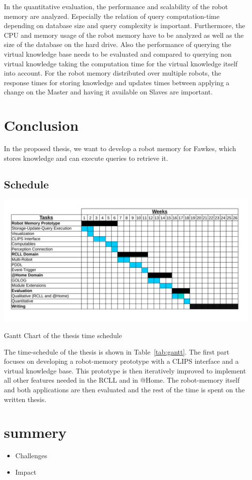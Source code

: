 \documentclass[a4paper,11pt]{article}
\newcommand{\reftab}[1]{Table~\ref{#1}}
\begin{document}

In the quantitative evaluation, the performance and scalability of the
robot memory are analyzed. Especially the relation of query
computation-time depending on database size and query complexity is
important. Furthermore, the CPU and memory usage of the robot memory
have to be analyzed as well as the size of the database on the hard
drive. Also the performance of querying the virtual knowledge base
needs to be evaluated and compared to querying non virtual knowledge
taking the computation time for the virtual knowledge itself into
account. For the robot memory distributed over multiple robots, the
response times for storing knowledge and updates times between
applying a change on the Master and having it available on Slaves are
important.

\section{Conclusion}
\label{sec:conclusion}
In the proposed thesis, we want to develop a robot memory for Fawkes,
which stores knowledge and can execute queries to retrieve it.

\subsection{Schedule}
\begin{table}
  \centering
  \includegraphics[width=\textwidth]{gantt-chart}%
  \vspace{-5mm}
  \caption{Gantt Chart of the thesis time schedule}
  \label{tab:gantt}
\end{table}
The time-schedule of the thesis is shown in \reftab{tab:gantt}. The
first part focuses on developing a robot-memory prototype with a CLIPS
interface and a virtual knowledge base. This prototype is then
iteratively improved to implement all other features needed in the
RCLL and in @Home. The robot-memory itself and both applications are
then evaluated and the rest of the time is spent on the written
thesis.

\section{summery}
\label{sec:summery}
\begin{itemize}
\item Challenges
\item Impact
\end{itemize}




\end{document}
